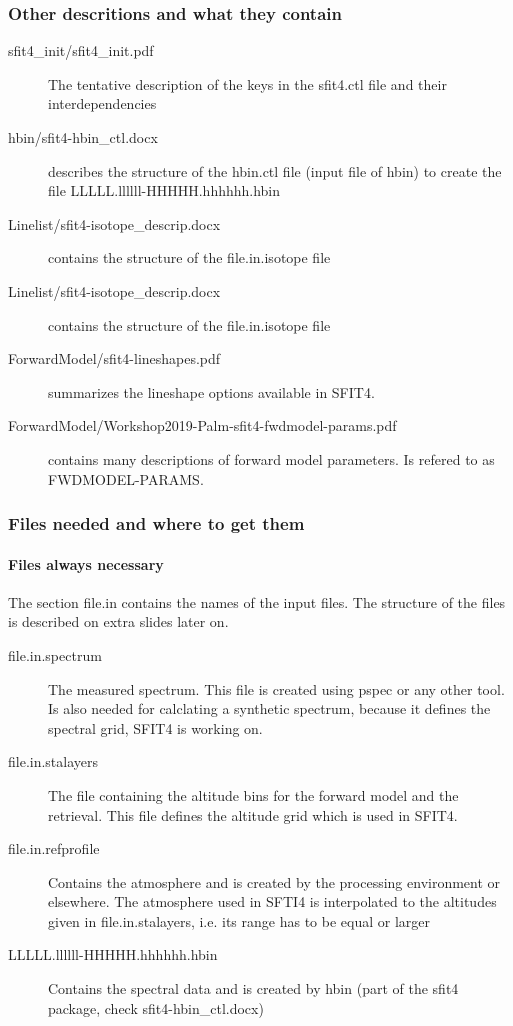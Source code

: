 \documentclass[notes=hide]{beamer}
\begin{document}
\begin{frame}
  \frametitle{Other descritions and what they contain}
  \begin{description}
  \item[sfit4\_init/sfit4\_init.pdf] The tentative description of the
    keys in the sfit4.ctl file and their interdependencies
  \item[hbin/sfit4-hbin\_ctl.docx] describes the structure of the
    hbin.ctl file (input file of hbin) to create the file
    LLLLL.llllll-HHHHH.hhhhhh.hbin
  \item[Linelist/sfit4-isotope\_descrip.docx] contains the structure of
    the file.in.isotope file 
  \item[Linelist/sfit4-isotope\_descrip.docx] contains the structure of
    the file.in.isotope file 
  \item[ForwardModel/sfit4-lineshapes.pdf] summarizes the lineshape options available in SFIT4.
  \item[ForwardModel/Workshop2019-Palm-sfit4-fwdmodel-params.pdf] contains many
    descriptions of forward model parameters. Is refered to as FWDMODEL-PARAMS.
  \end{description}
\end{frame}



\begin{frame}
  \frametitle{Files needed and where to get them}
  \framesubtitle{Files always necessary}
  The section file.in
  contains the names of the input files. The structure of the files is
  described on extra slides later on.
  \begin{description}
  \item[file.in.spectrum] The measured spectrum. This file is created
    using pspec or any other tool. Is also needed for calclating a
    synthetic spectrum, because it defines the spectral grid, SFIT4 is
    working on.
  \item[file.in.stalayers] The file containing the altitude bins for
    the forward model and the retrieval. This file defines the
    altitude grid which is used in SFIT4.
  \item[file.in.refprofile] Contains the atmosphere and is created by
    the processing environment or elsewhere. The atmosphere used in
    SFTI4 is interpolated to the altitudes given in file.in.stalayers,
    i.e. its range has to be equal or larger
  \item[LLLLL.llllll-HHHHH.hhhhhh.hbin] Contains the spectral data and
    is created by hbin (part of the sfit4 package, check sfit4-hbin\_ctl.docx)
  \end{description}
\end{frame}
\end{document}
